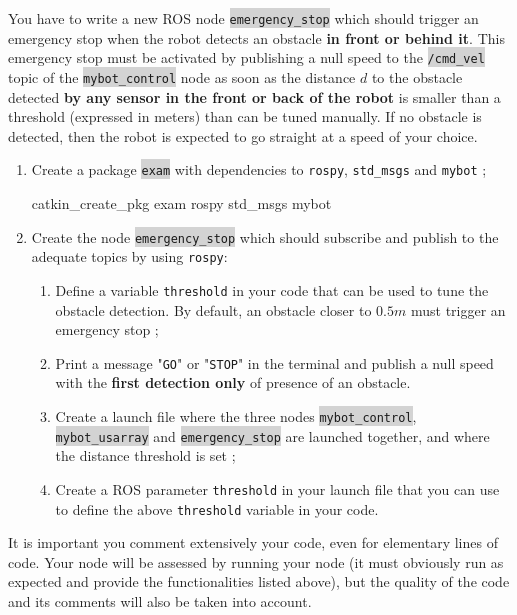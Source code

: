 \documentclass[10pt,a4paper,english]{exam}
\newcounter{mainmemorder}
\newcommand{\save}{\setcounter{mainmemorder}{\value{enumi}}}
\newcommand{\load}{\setcounter{enumi}{\value{mainmemorder}}}
\newcommand{\mytext}[1]{\colorbox{lightgray}{\texttt{#1}}}
\begin{document}
You have to write a new ROS node \mytext{emergency\_stop} which should trigger an emergency stop
when the robot detects an obstacle \textbf{in front or behind it}. This emergency stop must be
activated by publishing a null speed to the \mytext{/cmd\_vel} topic of the \mytext{mybot\_control}
node  as soon as the distance $d$ to the obstacle detected \textbf{by any sensor in the front or
	back of the robot} is smaller than a threshold (expressed in meters) than can be tuned manually. If
no obstacle is detected, then the robot is expected to go straight at a speed of your choice.
\begin{enumerate}
	\load
	\item Create a package \mytext{exam} with dependencies to \texttt{rospy}, \texttt{std\_msgs} and \texttt{mybot} ;
	      \begin{solution}
		      catkin\_create\_pkg exam rospy std\_msgs mybot
	      \end{solution}
	\item Create the node \mytext{emergency\_stop} which should subscribe and publish to the
	      adequate topics by using \texttt{rospy}:
	      \begin{enumerate}
		      \item Define a variable \texttt{threshold} in your code that can be used to tune the
		            obstacle detection. By default, an obstacle closer to $0.5m$ must trigger an emergency
		            stop ;
		      \item Print a message "\texttt{GO}" or "\texttt{STOP}" in the terminal and publish a
		            null speed with the \textbf{first detection only} of presence of an
		            obstacle.
		      \item Create a launch file where the three nodes \mytext{mybot\_control},
		            \mytext{mybot\_usarray} and \mytext{emergency\_stop} are launched together, and
		            where the distance threshold is set ;
		      \item Create a ROS parameter \texttt{threshold} in your launch file that you can use
		            to define the above \texttt{threshold} variable in your code.

	      \end{enumerate}
	      \save
\end{enumerate}

\begin{mdframed}[style=evaluation]
	It is important you comment extensively your code, even for elementary lines of code. Your node
	will be assessed by running your node (it must obviously run as expected and provide the
	functionalities listed above), but the quality of the code and its comments will also be taken
	into account.
\end{mdframed}
\end{document}
